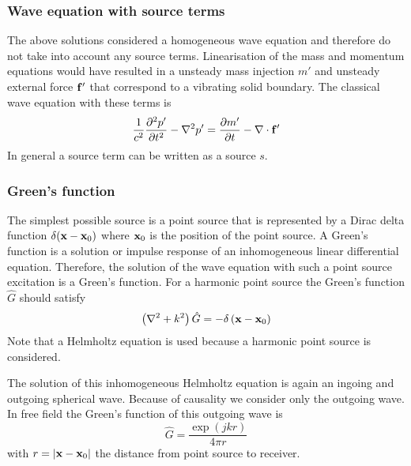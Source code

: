 \subsubsection*{Wave equation with source terms}
The above solutions considered a homogeneous wave equation and therefore do not
take into account any source terms. Linearisation of the mass and momentum equations
would have resulted in a unsteady mass injection $m'$ and unsteady external
force $\mathbf{f'}$ that correspond to a vibrating solid boundary. The classical wave equation with these terms is
\begin{equation}
   \frac{1}{c^2} \frac{\partial^2 p'}{\partial t^2} - \nabla^2 p' = \frac{\partial m'}{\partial t} - \nabla \cdot \mathbf{f}'
\end{equation}
In general a source term can be written as a source $s$.

\subsubsection*{Green's function}\label{sec:theory:sound:green}
The simplest possible source is a point source that is represented by a Dirac
delta function $\delta(\mathbf{x}-\mathbf{x}_0)$ where $\mathbf{x}_0$ is the position
of the point source. A Green's function is a solution or impulse response of an
inhomogeneous linear differential equation.
Therefore, the solution of the wave equation with such a point source excitation
is a Green's function. For a harmonic point source the Green's function
$\hat{G}$ should satisfy
\begin{equation}
  \left( \nabla^2 + k^2 \right) \hat{G} = - \delta \left( \mathbf{x} - \mathbf{x}_0 \right)
\end{equation}
Note that a Helmholtz equation is used because a harmonic point source is considered.


The solution of this inhomogeneous Helmholtz equation is again an
ingoing and outgoing spherical wave. Because of causality we consider only the
outgoing wave. In free field the Green's function of this outgoing wave is
\begin{equation}\label{eq:theory:sound:green-free-field}
  \hat{G} = \frac{\exp{\left(jkr\right)}}{4 \pi r}
\end{equation}
with $r = \left| \mathbf{x} - \mathbf{x}_0 \right|$ the distance from point source to receiver.



